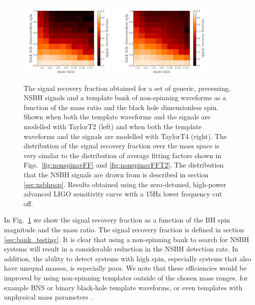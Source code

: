 \begin{figure}
    \centering
    \begin{minipage}[l]{\columnwidth}
    \centering
\includegraphics[width=0.45\textwidth]
{papers/nsbh_effectualness/figure10A.pdf}
\includegraphics[width=0.45\textwidth]
{papers/nsbh_effectualness/figure10B.pdf}
\caption{\label{fig:nonspineffFF}
The signal recovery fraction obtained for a set of generic, precessing, NSBH
signals and a template bank of non-spinning waveforms as a function of the mass
ratio and the black hole dimensionless spin. Shown when both the
template waveforms and the signals are modelled with TaylorT2 (left) and when
both the template waveforms and the signals are modelled with TaylorT4 (right).
The distribution of the signal recovery fraction over the mass space is very 
similar to the distribution of average fitting factors shown in 
Figs.~\ref{fig:nonspinavFF} and \ref{fig:nonspinavFFT2}.
The distribution that the NSBH
signals are drawn from is described in section \ref{sec:nsbhpop}.
Results obtained
using the zero-detuned, high-power advanced LIGO sensitivity curve with a 15Hz
lower frequency cut off.
}
\end{minipage}
\end{figure}

In Fig.~\ref{fig:nonspineffFF} we show
the signal recovery fraction as a function of the \ac{BH} spin magnitude and
the mass ratio. The signal recovery fraction is defined in section 
\ref{sec:bank_testing}.
It is clear that using a non-spinning bank to search for \ac{NSBH} systems will
result in a considerable reduction
in the \ac{NSBH} detection rate. In addition, the ability to
detect systems with high spin, especially systems that also have unequal 
masses, is especially poor.  We note that these efficiencies would be
improved by using non-spinning templates outside of the chosen mass ranges, for
example \ac{BNS} or binary black-hole template waveforms, or even templates
with unphysical mass parameters \cite{Brown:2012qf,Baird:2012cu}.

